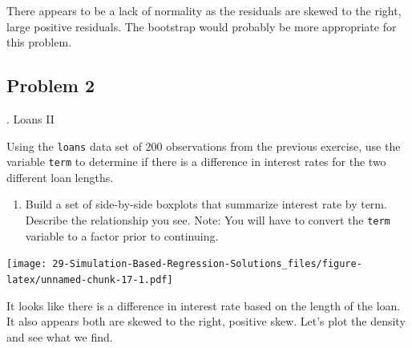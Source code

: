\documentclass[
]{book}
\newenvironment{Shaded}{\begin{snugshade}}{\end{snugshade}}
\newcommand{\DataTypeTok}[1]{\textcolor[rgb]{0.13,0.29,0.53}{#1}}
\newcommand{\KeywordTok}[1]{\textcolor[rgb]{0.13,0.29,0.53}{\textbf{#1}}}
\newcommand{\NormalTok}[1]{#1}
\newcommand{\OperatorTok}[1]{\textcolor[rgb]{0.81,0.36,0.00}{\textbf{#1}}}
\newcommand{\StringTok}[1]{\textcolor[rgb]{0.31,0.60,0.02}{#1}}
\providecommand{\tightlist}{%
  \setlength{\itemsep}{0pt}\setlength{\parskip}{0pt}}
\begin{document}
There appears to be a lack of normality as the residuals are skewed to the right, large positive residuals. The bootstrap would probably be more appropriate for this problem.

\hypertarget{problem-2-26}{%
\subsection{Problem 2}\label{problem-2-26}}

. Loans II

Using the \texttt{loans} data set of 200 observations from the previous exercise, use the variable \texttt{term} to determine if there is a difference in interest rates for the two different loan lengths.

\begin{enumerate}
\def\labelenumi{\alph{enumi}.}
\tightlist
\item
  Build a set of side-by-side boxplots that summarize interest rate by term. Describe the relationship you see. Note: You will have to convert the \texttt{term} variable to a factor prior to continuing.
\end{enumerate}

\begin{Shaded}
\end{Shaded}

\texttt{[image: 29-Simulation-Based-Regression-Solutions\_files/figure-latex/unnamed-chunk-17-1.pdf]}

It looks like there is a difference in interest rate based on the length of the loan. It also appears both are skewed to the right, positive skew. Let's plot the density and see what we find.

\begin{Shaded}
\end{Shaded}
\end{document}
